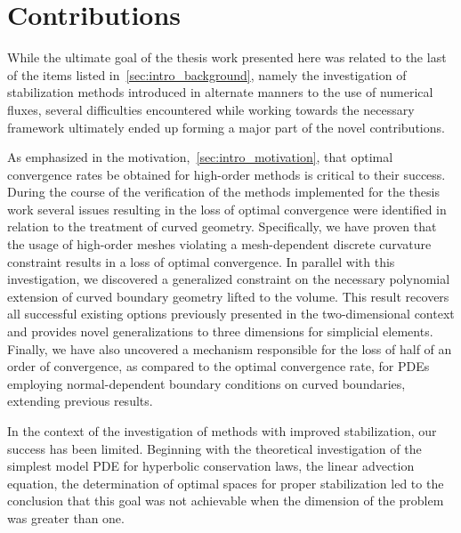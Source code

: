 \section{Contributions}
While the ultimate goal of the thesis work presented here
was related to the last of the items listed in~\autoref{sec:intro_background}, namely the investigation of
stabilization methods introduced in alternate manners to the use of numerical
fluxes, several difficulties encountered while working towards the necessary
framework ultimately ended up forming a major part of the novel contributions.

As emphasized in the motivation,~\autoref{sec:intro_motivation}, that optimal
convergence rates be obtained for high-order methods is critical to their
success.
During the course of the verification of the methods implemented for
the thesis work several issues resulting in the loss of optimal convergence were
identified in relation to the treatment of curved geometry.
Specifically, we have proven that the usage of high-order meshes violating a
mesh-dependent discrete curvature constraint results in a loss of optimal
convergence.
In parallel with this investigation, we discovered a generalized
constraint on the necessary polynomial extension of curved boundary geometry lifted
to the volume.
This result recovers all successful existing options previously
presented in the two-dimensional context and provides novel generalizations to
three dimensions for simplicial elements.
Finally, we have also uncovered a mechanism responsible for
the loss of half of an order of convergence, as compared to the optimal
convergence rate, for PDEs employing normal-dependent boundary conditions on
curved boundaries, extending previous results.


 In the context of the investigation of
methods with improved stabilization, our success has been limited. Beginning
with the theoretical investigation of the simplest model PDE for hyperbolic
conservation laws, the linear advection equation, the determination of optimal
spaces for proper stabilization led to the conclusion that this goal was not
achievable when the dimension of the problem was greater than one.

